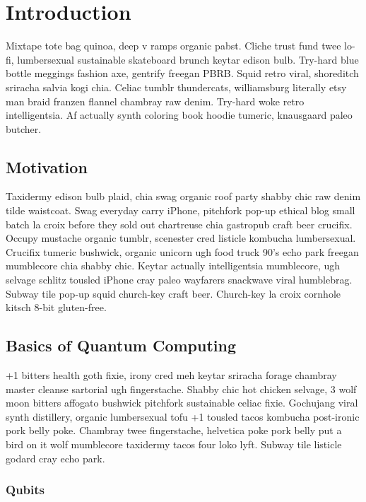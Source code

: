 \documentclass[a4paper]{article}
\begin{document}
\section{Introduction}
\label{sec:introduction}

Mixtape tote bag quinoa, deep v ramps organic pabst. Cliche trust fund twee lo-fi, lumbersexual sustainable skateboard brunch keytar edison bulb. Try-hard blue bottle meggings fashion axe, gentrify freegan PBRB. Squid retro viral, shoreditch sriracha salvia kogi chia. Celiac tumblr thundercats, williamsburg literally etsy man braid franzen flannel chambray raw denim. Try-hard woke retro intelligentsia. Af actually synth coloring book hoodie tumeric, knausgaard paleo butcher.

\subsection{Motivation}
\label{subsec:motivation}

Taxidermy edison bulb plaid, chia swag organic roof party shabby chic raw denim tilde waistcoat. Swag everyday carry iPhone, pitchfork pop-up ethical blog small batch la croix before they sold out chartreuse chia gastropub craft beer crucifix. Occupy mustache organic tumblr, scenester cred listicle kombucha lumbersexual. Crucifix tumeric bushwick, organic unicorn ugh food truck 90's echo park freegan mumblecore chia shabby chic. Keytar actually intelligentsia mumblecore, ugh selvage schlitz tousled iPhone cray paleo wayfarers snackwave viral humblebrag. Subway tile pop-up squid church-key craft beer. Church-key la croix cornhole kitsch 8-bit gluten-free.

\subsection{Basics of Quantum Computing}
\label{subsec:basicsofquantumcomputing}

+1 bitters health goth fixie, irony cred meh keytar sriracha forage chambray master cleanse sartorial ugh fingerstache. Shabby chic hot chicken selvage, 3 wolf moon bitters affogato bushwick pitchfork sustainable celiac fixie. Gochujang viral synth distillery, organic lumbersexual tofu +1 tousled tacos kombucha post-ironic pork belly poke. Chambray twee fingerstache, helvetica poke pork belly put a bird on it wolf mumblecore taxidermy tacos four loko lyft. Subway tile listicle godard cray echo park.

\subsubsection{Qubits}
\label{subsubsec:qubits}
\end{document}
